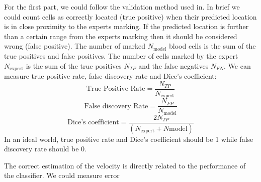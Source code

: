 \documentclass[]{article}
\begin{document}
For the first part, we could follow the validation method used in\cite{cunefare_open_2017}.
In brief we could count cells as correctly located (true positive) when their predicted location is in close proximity to the experts marking.
If the predicted location is further than a certain range from the experts marking then it should be considered wrong (false positive).
The number of marked $N_{\text{model}}$ blood cells is the sum of the true positives and false positives.
The number of cells marked by the expert $N_{\text{expert}}$ is the sum of the true positives $N_{TP}$ and the false negatives $N_{FN}$.
We can measure true positive rate, false discovery rate and Dice’s coefficient\cite{dice_measures_1945}:
\[
\text{True Positive Rate} =  \frac{N_{TP}}{N_{\text{expert}}}
\] 
\[
\text{False discovery Rate} = \frac{N_{FP}}{N_{\text{model}}}
\] 
\[
 \text{Dice's coefficient} = \frac{2N_{TP}}{(N_{\text{expert}}+ N{\text{model}})}
\]
In an ideal world, true positive rate and  Dice's coefficient  should be 1 while false discovery rate should be 0.

The correct estimation of the velocity is directly related to the performance of the classifier.
We could measure error 
\end{document}
